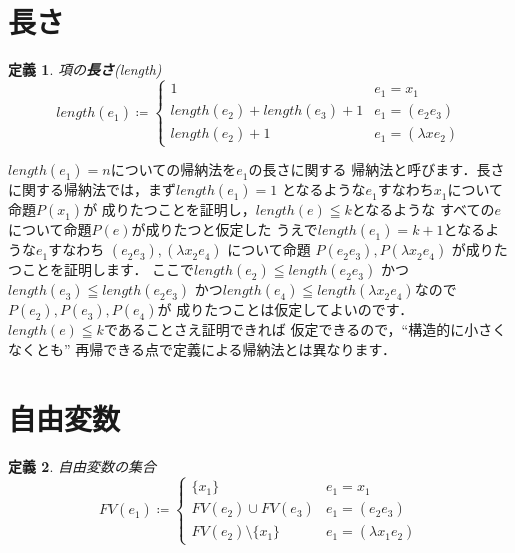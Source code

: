 \documentclass{ltjsbook}%
\newtheorem{definition}{定義}[section]%
\newcommand\term[2]{\textbf{#1}{(\textit{#2})}}%
\begin{document}
\section{長さ}%
\label{sect:length}%
\begin{definition}%
項の\term{長さ}{length}%
\begin{equation}%
  length(\mathit{e}_1^{}) \coloneqq \begin{cases}%
    1 & \mathit{e}_1^{} = \mathit{x}_1^{}\\%
    length(\mathit{e}_2^{}) + length(\mathit{e}_3^{}) + 1%
    & \mathit{e}_1^{} = (\mathit{e}_2^{}\mathit{e}_3^{})\\%
    length(\mathit{e}_2^{}) + 1 & \mathit{e}_1^{} = (\lambda\mathit{x}\mathit{e}_2^{})%
  \end{cases}%
\end{equation}%
\end{definition}%
\par$length(\mathit{e}_1^{})=n$についての帰納法を$\mathit{e}_1^{}$の長さに関する%
帰納法と呼びます．長さに関する帰納法では，まず$length(\mathit{e}_1^{}) = 1$%
となるような$\mathit{e}_1^{}$すなわち$\mathit{x}_1^{}$について命題$P(\mathit{x}_1^{})$が%
成りたつことを証明し，$length(\mathit{e})\leqq k$となるような%
すべての$\mathit{e}$について命題$P(\mathit{e})$が成りたつと仮定した%
うえで$length(\mathit{e}_1^{}) = k + 1$となるような$\mathit{e}_1^{}$すなわち%
$(\mathit{e}_2^{}\mathit{e}_3^{}),(\lambda\mathit{x}_2^{}\mathit{e}_4^{})$%
について命題%
$P(\mathit{e}_2^{}\mathit{e}_3^{}),P(\lambda\mathit{x}_2^{}\mathit{e}_4^{})$%
が成りたつことを証明します．%
ここで$length(\mathit{e}_2^{})\leqq length(\mathit{e}_2^{}\mathit{e}_3^{})$%
かつ$length(\mathit{e}_3^{})\leqq length(\mathit{e}_2^{}\mathit{e}_3^{})$%
かつ$length(\mathit{e}_4^{})\leqq length(\lambda\mathit{x}_2^{}\mathit{e}_4^{})$なので%
$P(\mathit{e}_2^{}),P(\mathit{e}_3^{}),P(\mathit{e}_4^{})$が%
成りたつことは仮定してよいのです．%
$length(\mathit{e})\leqq k$であることさえ証明できれば%
仮定できるので，``構造的に小さくなくとも''%
再帰できる点で定義による帰納法とは異なります．%
\section{自由変数}%
\label{untyped:fv}%
\begin{definition}%
自由変数の集合%
\begin{equation}%
  FV(\mathit{e}_1^{}) \coloneqq \begin{cases}%
    \{\mathit{x}_1^{}\} & \mathit{e}_1^{} = \mathit{x}_1^{}\\%
    FV(\mathit{e}_2^{})\cup FV(\mathit{e}_3^{})%
    & \mathit{e}_1^{} = (\mathit{e}_2^{}\mathit{e}_3^{})\\%
    FV(\mathit{e}_2^{})\setminus\{\mathit{x}_1^{}\}%
    & \mathit{e}_1^{} = (\lambda\mathit{x}_1^{}\mathit{e}_2^{})%
  \end{cases}%
\end{equation}%
\end{definition}%
\end{document}
